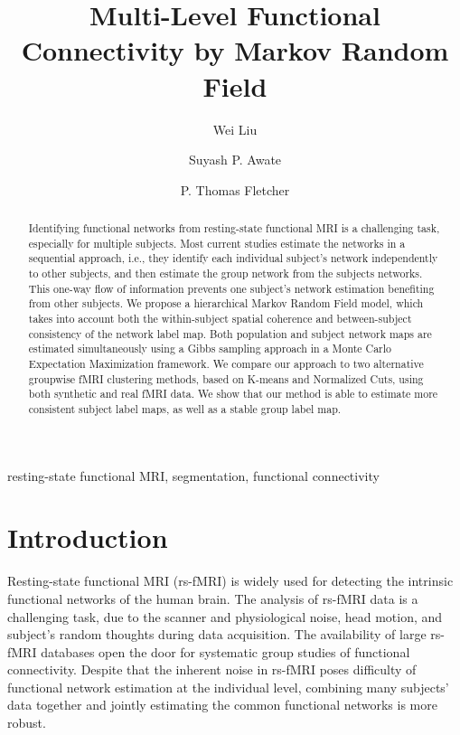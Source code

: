 \documentclass[final,authoryear,5p,twocolumn]{elsarticle}
\begin{document}
\begin{frontmatter}
  \title{Multi-Level Functional Connectivity by Markov Random Field}

  \author[sci]{Wei Liu}

  \author[sci]{Suyash P. Awate}

  \author[sci]{P. Thomas Fletcher}

  \address[sci]{Scientific Computing and Imaging Institute, University of
  Utah, USA}

  \begin{abstract}
    Identifying functional networks from resting-state functional MRI is a
    challenging task, especially for multiple subjects. Most current studies
    estimate the networks in a sequential approach, i.e., they identify each
    individual subject's network independently to other subjects, and then estimate
    the group network from the subjects networks. This one-way flow of information
    prevents one subject's network estimation benefiting from other subjects. We
    propose a hierarchical Markov Random Field model, which takes into account both
    the within-subject spatial coherence and between-subject consistency of the
    network label map. Both population and subject network maps are estimated
    simultaneously using a Gibbs sampling approach in a Monte Carlo Expectation
    Maximization framework. We compare our approach to two alternative groupwise
    fMRI clustering methods, based on K-means and Normalized Cuts, using both
    synthetic and real fMRI data. We show that our method is able to estimate more
    consistent subject label maps, as well as a stable group label map.
  \end{abstract}

  \begin{keyword}
    resting-state functional MRI, segmentation, functional connectivity
  \end{keyword}
\end{frontmatter}

\section{Introduction}
Resting-state functional MRI (rs-fMRI) is widely used for detecting the
intrinsic functional networks of the human brain. The analysis of rs-fMRI data
is a challenging task, due to the scanner and physiological noise, head motion,
and subject's random thoughts during data acquisition. The availability of large
rs-fMRI databases open the door for systematic group studies of functional
connectivity. Despite that the inherent noise in rs-fMRI poses difficulty of
functional network estimation at the individual level, combining many subjects'
data together and jointly estimating the common functional networks is more
robust.
\end{document}
